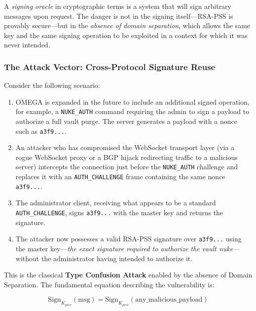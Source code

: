 \documentclass[12pt,a4paper]{article}
\begin{document}
A \textit{signing oracle} in cryptographic terms is a system that will sign arbitrary messages upon request. The danger is not in the signing itself---RSA-PSS is provably secure---but in the \textit{absence of domain separation}, which allows the same key and the same signing operation to be exploited in a context for which it was never intended.

\subsubsection{The Attack Vector: Cross-Protocol Signature Reuse}

Consider the following scenario:

\begin{enumerate}
    \item OMEGA is expanded in the future to include an additional signed operation, for example, a \texttt{NUKE\_AUTH} command requiring the admin to sign a payload to authorize a full vault purge. The server generates a payload with a nonce such as \texttt{a3f9...}. 
    
    \item An attacker who has compromised the WebSocket transport layer (via a rogue WebSocket proxy or a BGP hijack redirecting traffic to a malicious server) intercepts the connection just before the \texttt{NUKE\_AUTH} challenge and replaces it with an \texttt{AUTH\_CHALLENGE} frame containing the same nonce \texttt{a3f9...}.
    
    \item The administrator client, receiving what appears to be a standard \texttt{AUTH\_CHALLENGE}, signs \texttt{a3f9...} with the master key and returns the signature.
    
    \item The attacker now possesses a valid RSA-PSS signature over \texttt{a3f9...} using the master key---\textit{the exact signature required to authorize the vault nuke}---without the administrator having intended to authorize it.
\end{enumerate}

This is the classical \textbf{Type Confusion Attack} enabled by the absence of Domain Separation. The fundamental equation describing the vulnerability is:

\begin{equation}
    \text{Sign}_{K_{priv}}(\text{msg}) = \text{Sign}_{K_{priv}}(\text{any\_malicious\_payload})
\end{equation}
\end{document}
